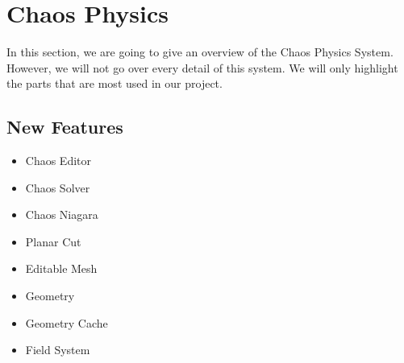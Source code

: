 \documentclass[sigconf]{acmart}
\begin{document}
\section{Chaos Physics}

In this section, we are going to give an overview of the Chaos Physics System. However, we will not go over every detail of this system. We will only highlight the parts that are most used in our project. 

\subsection{New Features}

\begin{itemize}
    \item Chaos Editor
    \item Chaos Solver
    \item Chaos Niagara
    \item Planar Cut
    \item Editable Mesh
    \item Geometry
    \item Geometry Cache
    \item Field System
\end{itemize}
\end{document}
